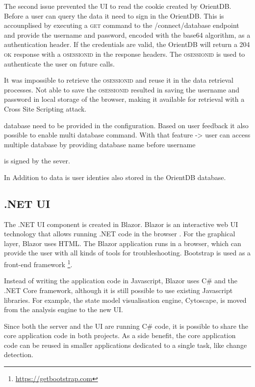 The second issue prevented the UI to read the cookie created by OrientDB. Before a user can query the data it need to sign in the OrientDB. This is accounplised by executing a \textsc{get} command to the /connect/database endpoint and provide the username and password, encoded with the base64 algorithm, as a authentication header. If the credentials are valid, the OrientDB will return a \textsc{204 ok} response with a \textsc{osessionid} in the response headers. The \textsc{osessionid} is used to authenticate the user on future calls.

It was impossible to retrieve the \textsc{osessionid} and reuse it in the data retrieval processes. Not able to save the \textsc{osessionid} resulted in saving the username and password in local storage of the browser, making it available for retrieval with a Cross Site Scripting attack. 

database need to be provided in the configuration. Based on user feedback it also possible to enable multi database command. With that feature -> user can access multiple database by providing database name before username 

is signed by the sever. 

In Addition to data is user identies also stored in the OrientDB database. 

\subsection{.NET UI}
The .NET UI component is created in Blazor. Blazor is an interactive web UI technology that allows running .NET code in the browser \cite{what-is-blazor}. For the graphical layer, Blazor uses HTML. The Blazor application runs in a browser, which can provide the user with all kinds of tools for troubleshooting. Bootstrap is used as a front-end framework \footnote{\url{https://getbootstrap.com}}.

Instead of writing the application code in Javascript, Blazor uses C\# and the .NET Core framework, although it is still possible to use existing Javascript libraries. For example, the state model visualisation engine, Cytoscape, is moved from the \testar analysis engine to the new \testarnet UI.

Since both the server and the UI are running C\# code, it is possible to share the core application code in both projects. As a side benefit, the core application code can be reused in smaller applications dedicated to a single task, like change detection. 

